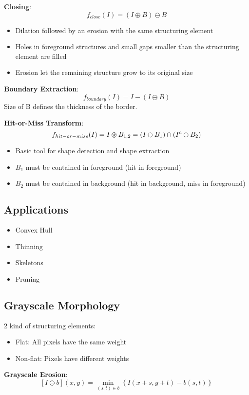 \textbf{Closing}:
\[
f_{close}(I) = (I \oplus B) \ominus B
\]
\begin{itemize}
    \item Dilation followed by an erosion with the same structuring element
    \item Holes in foreground structures and small gaps smaller than the structuring element are filled
    \item Erosion let the remaining structure grow to its original size
\end{itemize}

\textbf{Boundary Extraction}:
\[
f_{boundary}(I) = I  - (I \ominus B)
\]
Size of B defines the thickness of the border.

\textbf{Hit-or-Miss Transform}:
\[
f_{hit-or-miss}(I)= I \ostar B_{1,2} = (I \ominus B_1) \cap (I^c \ominus B_2)
\]
\begin{itemize}
    \item Basic tool for shape detection and shape extraction
    \item \(B_1\) must be contained in foreground (hit in foreground)
    \item \(B_2\) must be contained in background (hit in background, miss in foreground)
\end{itemize}

\subsection{Applications}
\begin{itemize}
    \item Convex Hull
    \item Thinning
    \item Skeletons
    \item Pruning
\end{itemize}

\subsection{Grayscale Morphology}
2 kind of structuring elements:
\begin{itemize}
    \item Flat: All pixels have the same weight
    \item Non-flat: Pixels have different weights
\end{itemize}
\textbf{Grayscale Erosion}:
\[
[I \ominus b](x, y) = \min_{(s, t) \in b} \left\{ I(x + s, y + t) - b(s, t) \right\}
\]

